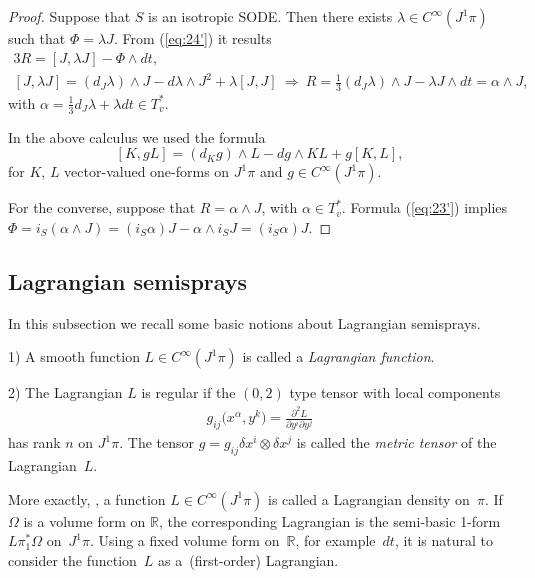 \begin{proof}
Suppose that $S$ is an isotropic SODE. Then there exists $\lambda\in C^{\infty}(J^{1}\pi)$
such that $\Phi=\lambda J$. From (\ref{eq:24'}) it results
\begin{gather*}
3R   =   [J,\lambda J]-\Phi\wedge dt,\\
{}[J,\lambda J]   =   \left(d_{J}\lambda\right)\wedge J-d\lambda\wedge J^{2}+\lambda[J,J] \ \Rightarrow \
R   =   \frac{1}{3}\left(d_{J}\lambda\right)\wedge J-\lambda J\wedge dt=\alpha\wedge J,
\end{gather*}
 with $\alpha=\frac{1}{3}d_{J}\lambda+\lambda dt\in T_{v}^{*}$.

In the above calculus we used the formula \cite{grifone00}\[
[K,gL]= (d_{K}g )\wedge L-dg\wedge KL+g[K,L],\]
 for $K$, $L$ vector-valued one-forms on $J^{1}\pi$ and $g\in C^{\infty}(J^{1}\pi)$.

For the converse, suppose that $R=\alpha\wedge J$, with $\alpha\in T_{v}^{*}$.
Formula (\ref{eq:23'}) implies $\Phi=i_{S} (\alpha\wedge J )= (i_{S}\alpha )J-\alpha\wedge i_{S}J= (i_{S}\alpha )J$.
\end{proof}


\subsection{Lagrangian semisprays}

In this subsection we recall some basic notions about Lagrangian semisprays.

\begin{definition}\null \qquad

1) A smooth function $L\in C^{\infty}(J^{1}\pi)$ is called a \emph{Lagrangian
function}.

2) The Lagrangian $L$ is regular if the $(0,2)$ type tensor with
local components
\begin{gather*}
g_{ij}\big(x^{\alpha},y^{k}\big)=\frac{\partial^{2}L}{\partial y^{i}\partial y^{j}}%
\end{gather*}
has rank $n$ on $J^{1}\pi$. The tensor $g=g_{ij}\delta x^{i}\otimes\delta x^{j}$
is called the \emph{metric tensor} of the Lagrangian~$L$.
\end{definition}

\begin{remark}
More exactly, \cite{saunders89}, a function $L\in C^{\infty}(J^{1}\pi)$
is called a Lagrangian density on~$\pi$. If~$\Omega$ is a volume
form on $\mathbb{R}$, the corresponding Lagrangian is the semi-basic
1-form $L\pi_{1}^{*}\Omega$ on~$J^{1}\pi$. Using a f\/ixed volume form
on~$\mathbb{R}$, for example~$dt$, it is natural to consider the
function~$L$ as a~(f\/irst-order) Lagrangian.
\end{remark}

